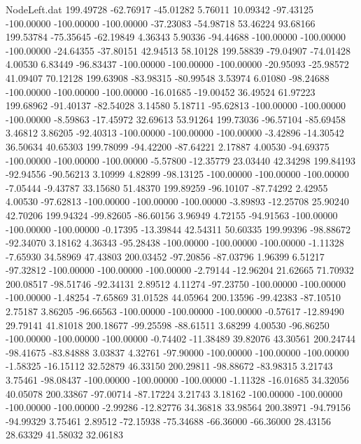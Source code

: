 \begin{filecontents}{NodeLeft.dat}
 199.49728  -62.76917  -45.01282     5.76011   10.09342  -97.43125 -100.00000 -100.00000 -100.00000  -37.23083  -54.98718   53.46224   93.68166
 199.53784  -75.35645  -62.19849     4.36343    5.90336  -94.44688 -100.00000 -100.00000 -100.00000  -24.64355  -37.80151   42.94513   58.10128
 199.58839  -79.04907  -74.01428     4.00530    6.83449  -96.83437 -100.00000 -100.00000 -100.00000  -20.95093  -25.98572   41.09407   70.12128
 199.63908  -83.98315  -80.99548     3.53974    6.01080  -98.24688 -100.00000 -100.00000 -100.00000  -16.01685  -19.00452   36.49524   61.97223
 199.68962  -91.40137  -82.54028     3.14580    5.18711  -95.62813 -100.00000 -100.00000 -100.00000   -8.59863  -17.45972   32.69613   53.91264
 199.73036  -96.57104  -85.69458     3.46812    3.86205  -92.40313 -100.00000 -100.00000 -100.00000   -3.42896  -14.30542   36.50634   40.65303
 199.78099  -94.42200  -87.64221     2.17887    4.00530  -94.69375 -100.00000 -100.00000 -100.00000   -5.57800  -12.35779   23.03440   42.34298
 199.84193  -92.94556  -90.56213     3.10999    4.82899  -98.13125 -100.00000 -100.00000 -100.00000   -7.05444   -9.43787   33.15680   51.48370
 199.89259  -96.10107  -87.74292     2.42955    4.00530  -97.62813 -100.00000 -100.00000 -100.00000   -3.89893  -12.25708   25.90240   42.70206
 199.94324  -99.82605  -86.60156     3.96949    4.72155  -94.91563 -100.00000 -100.00000 -100.00000   -0.17395  -13.39844   42.54311   50.60335
 199.99396  -98.88672  -92.34070     3.18162    4.36343  -95.28438 -100.00000 -100.00000 -100.00000   -1.11328   -7.65930   34.58969   47.43803
 200.03452  -97.20856  -87.03796     1.96399    6.51217  -97.32812 -100.00000 -100.00000 -100.00000   -2.79144  -12.96204   21.62665   71.70932
 200.08517  -98.51746  -92.34131     2.89512    4.11274  -97.23750 -100.00000 -100.00000 -100.00000   -1.48254   -7.65869   31.01528   44.05964
 200.13596  -99.42383  -87.10510     2.75187    3.86205  -96.66563 -100.00000 -100.00000 -100.00000   -0.57617  -12.89490   29.79141   41.81018
 200.18677  -99.25598  -88.61511     3.68299    4.00530  -96.86250 -100.00000 -100.00000 -100.00000   -0.74402  -11.38489   39.82076   43.30561
 200.24744  -98.41675  -83.84888     3.03837    4.32761  -97.90000 -100.00000 -100.00000 -100.00000   -1.58325  -16.15112   32.52879   46.33150
 200.29811  -98.88672  -83.98315     3.21743    3.75461  -98.08437 -100.00000 -100.00000 -100.00000   -1.11328  -16.01685   34.32056   40.05078
 200.33867  -97.00714  -87.17224     3.21743    3.18162 -100.00000 -100.00000 -100.00000 -100.00000   -2.99286  -12.82776   34.36818   33.98564
 200.38971  -94.79156  -94.99329     3.75461    2.89512  -72.15938  -75.34688  -66.36000  -66.36000   28.43156   28.63329   41.58032   32.06183

\end{filecontents}
